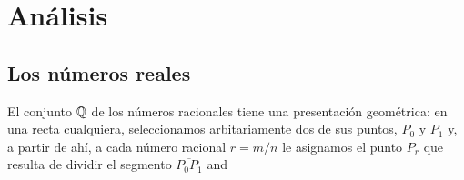 \chapter{Análisis}
\section{Los números reales}
El conjunto $\mathbb{Q}$ de los números racionales tiene una presentación
geométrica: en una recta cualquiera, seleccionamos arbitariamente dos de
sus puntos, $P_0$ y $P_1$ y, a partir de ahí, a cada número racional
$r=m/n$ le asignamos el punto $P_r$ que resulta de dividir el segmento
$\overline{P_0P_1}$ and

